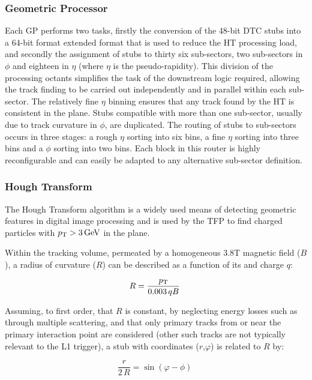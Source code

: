 \subsubsection{Geometric Processor}\label{subsubsec:GP}
Each GP performs two tasks, firstly the conversion of the 48-bit DTC stubs into a 64-bit format extended format that is used to reduce the HT processing load, and secondly the assignment of stubs to thirty six sub-sectors, two sub-sectors in $\phi$ and eighteen in $\eta$ (where $\eta$ is the pseudo-rapidity). 
This division of the processing octants simplifies the task of the downstream logic required, allowing the track finding to be carried out independently and in parallel within each sub-sector. 
The relatively fine $\eta$ binning ensures that any track found by the \rphi HT is consistent in the \rz plane. Stubs compatible with more than one sub-sector, usually due to track curvature in $\phi$, are duplicated. 
The routing of stubs to sub-sectors occurs in three stages: a rough $\eta$ sorting into six bins, a fine $\eta$ sorting into three bins and a $\phi$ sorting into two bins. 
Each block in this router is highly reconfigurable and can easily be adapted to any alternative sub-sector definition.

\subsubsection{Hough Transform}
The Hough Transform algorithm is a widely used means of detecting geometric features in digital image processing \cite{HT} and is used by the TFP to find charged particles with $p_{\mathrm{T}} > 3\,\text{Ge\hspace{-.08em}V}$ in the \rphi plane. 

Within the tracking volume, permeated by a homogeneous 3.8T magnetic field ($B$), a radius of curvature ($R$) can be described as a function of its \pT and charge $q$:

\begin{equation}
R = \frac{p_{\mathrm{T}}}{0.003\,qB} \;
\label{eq:R}
\end{equation}

Assuming, to first order, that $R$ is constant, by neglecting energy losses such as through multiple scattering, and that only primary tracks from or near the primary interaction point are considered (other such tracks are not typically relevant to the L1 trigger), a stub with coordinates ($r$,$\varphi$) is related to $R$ by:

\begin{equation}
\frac r{2\,R} = \sin\left(\varphi-\phi\right) \;
\label{eq:stub_R}
\end{equation}

